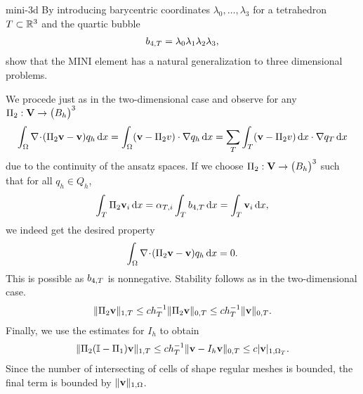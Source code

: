\begin{Problem}{mini-3d}
  By introducing barycentric coordinates $\lambda_0,\dots,\lambda_3$
  for a tetrahedron $T\subset\mathbb R^3$ and the quartic bubble
  \begin{gather}
    b_{4,T} = \lambda_0\lambda_1\lambda_2\lambda_3,
  \end{gather}
  show that the MINI element has a natural generalization to three
  dimensional problems.
\begin{solution}
  We procede just as in the two-dimensional case and observe for any
  $\Pi_2: \mathbf V \to \bigl(B_h\bigr)^3$
  \begin{align}
    \int_\Omega \nabla\!\cdot\!(\Pi_2 \mathbf v-\mathbf v) q_h \,\mathrm{d} x
    = \int_\Omega (\mathbf v-\Pi_2v)\cdot\nabla q_h\,\mathrm{d} x = \sum_T\int_T (\mathbf v-\Pi_2v)\,\mathrm{d} x\cdot\nabla q_T\,\mathrm{d} x
  \end{align}
  due to the continuity of the ansatz spaces.
  If we choose $\Pi_2: \mathbf V \to \bigl(B_h\bigr)^3$ such that for all $q_h\in Q_h$,
  \begin{align}
   \int_T \Pi_2 \mathbf v_i \,\mathrm{d} x
    = \alpha_{T,i} \int_T b_{4,T}\,\mathrm{d} x
    = \int_T \mathbf v_i\,\mathrm{d} x,
  \end{align}
  we indeed get the desired property
  \begin{align}
    \int_\Omega \nabla\!\cdot\!(\Pi_2 \mathbf v-\mathbf v) q_h \,\mathrm{d} x = 0.
  \end{align}
  This is possible as $b_{4,T}$ is nonnegative. Stability follows as in the two-dimensional case.
  \begin{gather}
    \lVert\Pi_2 \mathbf v\rVert_{1,T}
    \le c h_T^{-1} \lVert\Pi_2 \mathbf v\rVert_{0,T}
    \le c h_T^{-1} \lVert\mathbf v\rVert_{0,T}.
  \end{gather}
  Finally, we use the estimates for $I_h$ to obtain
  \begin{gather}
    \lVert\Pi_2 (\mathbb I-\Pi_1) \mathbf v\rVert_{1,T}
    \le c h_T^{-1} \lVert\mathbf v-I_h \mathbf v\rVert_{0,T}
    \le c \lvert\mathbf v\rvert_{1,\Omega_T}.
  \end{gather}
  Since the number of intersecting of cells of shape regular meshes is
  bounded, the final term is bounded by $\lVert\mathbf v\rVert_{1,\Omega}$.
\end{solution}

\end{Problem}

